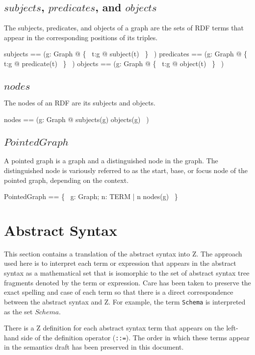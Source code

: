 \documentclass{article}
\begin{document}
\subsection{$subjects$, $predicates$, and $objects$}
The subjects, predicates, and objects of a graph are the sets of RDF terms that appear in the corresponding positions of its triples.
\begin{zed}
	subjects == (\lambda g: Graph @ \{~ t:g @ subject(t) ~\} ~)
\also
	predicates == (\lambda g: Graph @ \{~ t:g @ predicate(t) ~\} ~)
\also
	objects == (\lambda g: Graph @ \{~ t:g @ object(t) ~\} ~)
\end{zed}

\subsection{$nodes$}
The nodes of an RDF are its subjects and objects.
\begin{zed}
	nodes == (\lambda g: Graph @ subjects(g) \cup objects(g) ~)
\end{zed}

\subsection{$PointedGraph$}
A pointed graph is a graph and a distinguished node in the graph.
The distinguished node is variously referred to as the start, base, or focus node of the pointed graph, depending on the context.
\begin{zed}
	PointedGraph == \{~ g: Graph; n: TERM | n \in nodes(g) ~\}
\end{zed}

\section{Abstract Syntax}
\label{sec-abstract-syntax}
This section contains a translation of the abstract syntax into Z.
The approach used here is to interpret each term or expression that appears in the abstract syntax as
a mathematical set that is isomorphic to the set of abstract syntax tree fragments denoted by the term or expression.
Care has been taken to preserve the exact spelling and case of each term so that there is a direct correspondence
between the abstract syntax and Z.
For example, the term {\tt Schema} is interpreted as the set $Schema$.

There is a Z definition for each abstract syntax term that appears on the left-hand side of the definition operator ({\tt ::=}).
The order in which these terms appear in the semantics draft has been preserved in this document.
\end{document}
